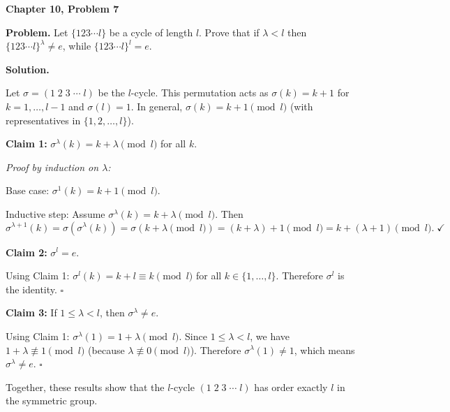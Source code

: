 \documentclass[12pt]{article}
\begin{document}
\begin{center}
{\Large\bfseries Chapter 10, Problem 7}
\end{center}

\noindent\textbf{Problem.} Let $\{123 \cdots l\}$ be a cycle of length $l$. Prove that if $\lambda < l$ then $\{123 \cdots l\}^\lambda \neq e$, while $\{123 \cdots l\}^l = e$.

\bigskip
\noindent\textbf{Solution.}

Let $\sigma = (1\;2\;3\;\cdots\;l)$ be the $l$-cycle. This permutation acts as $\sigma(k) = k+1$ for $k = 1, \ldots, l-1$ and $\sigma(l) = 1$. In general, $\sigma(k) = k + 1 \pmod{l}$ (with representatives in $\{1, 2, \ldots, l\}$).

\medskip
\noindent\textbf{Claim 1:} $\sigma^\lambda(k) = k + \lambda \pmod{l}$ for all $k$.

\textit{Proof by induction on $\lambda$:}

Base case: $\sigma^1(k) = k + 1 \pmod{l}$. \checkmark

Inductive step: Assume $\sigma^\lambda(k) = k + \lambda \pmod{l}$. Then
\[
\sigma^{\lambda+1}(k) = \sigma(\sigma^\lambda(k)) = \sigma(k + \lambda \pmod{l}) = (k + \lambda) + 1 \pmod{l} = k + (\lambda + 1) \pmod{l}. \; \checkmark
\]

\medskip
\noindent\textbf{Claim 2:} $\sigma^l = e$.

Using Claim 1: $\sigma^l(k) = k + l \equiv k \pmod{l}$ for all $k \in \{1, \ldots, l\}$. Therefore $\sigma^l$ is the identity. $\square$

\medskip
\noindent\textbf{Claim 3:} If $1 \leq \lambda < l$, then $\sigma^\lambda \neq e$.

Using Claim 1: $\sigma^\lambda(1) = 1 + \lambda \pmod{l}$. Since $1 \leq \lambda < l$, we have $1 + \lambda \not\equiv 1 \pmod{l}$ (because $\lambda \not\equiv 0 \pmod{l}$). Therefore $\sigma^\lambda(1) \neq 1$, which means $\sigma^\lambda \neq e$. $\square$

\medskip
Together, these results show that the $l$-cycle $(1\;2\;3\;\cdots\;l)$ has order exactly $l$ in the symmetric group.
\end{document}
